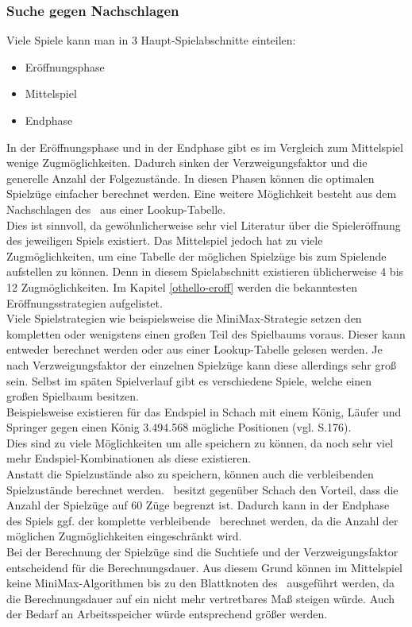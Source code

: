 \subsubsection{Suche gegen Nachschlagen}
\label{lookup}
Viele Spiele kann man in 3 Haupt-Spielabschnitte einteilen:
\begin{itemize}
\item Eröffnungsphase
\item Mittelspiel
\item Endphase
\end{itemize}
In der Eröffnungsphase und in der Endphase gibt es im Vergleich zum Mittelspiel wenige Zugmöglichkeiten. Dadurch sinken der Verzweigungsfaktor und die generelle Anzahl der Folgezustände. In diesen Phasen können die optimalen Spielzüge einfacher berechnet werden. Eine weitere Möglichkeit besteht aus dem Nachschlagen des \states\ aus einer Lookup-Tabelle.
\\Dies ist sinnvoll, da gewöhnlicherweise sehr viel Literatur über die Spieleröffnung des jeweiligen Spiels existiert.
Das Mittelspiel jedoch hat zu viele Zugmöglichkeiten, um eine Tabelle der möglichen Spielzüge bis zum Spielende aufstellen zu können. Denn in diesem Spielabschnitt existieren üblicherweise 4 bis 12 Zugmöglichkeiten. Im Kapitel \ref{othello-eroff} werden die bekanntesten Eröffnungsstrategien aufgelistet.
\\Viele Spielstrategien wie beispielsweise die MiniMax-Strategie setzen den kompletten oder wenigstens einen großen Teil des Spielbaums voraus. Dieser kann entweder berechnet werden oder aus einer Lookup-Tabelle gelesen werden. Je nach Verzweigungsfaktor der einzelnen Spielzüge kann diese allerdings sehr groß sein. Selbst im späten Spielverlauf gibt es verschiedene Spiele, welche einen großen Spielbaum besitzen.
\\Beispielsweise existieren für das Endspiel in Schach mit einem König, Läufer und Springer gegen einen König 3.494.568 mögliche Positionen (vgl. \cite{Russell.2016} S.176).
\\Dies sind zu viele Möglichkeiten um alle speichern zu können, da noch sehr viel mehr Endspiel-Kombinationen als diese existieren.
\\Anstatt die Spielzustände also zu speichern, können auch die verbleibenden Spielzustände berechnet werden. \ot\ besitzt gegenüber Schach den Vorteil, dass die Anzahl der Spielzüge auf 60 Züge begrenzt ist. Dadurch kann in der Endphase des Spiels ggf. der komplette verbleibende \gtree\ berechnet werden, da die Anzahl der möglichen Zugmöglichkeiten eingeschränkt wird.
\\Bei der Berechnung der Spielzüge sind die Suchtiefe und der Verzweigungsfaktor entscheidend für die Berechnungsdauer. Aus diesem Grund können im Mittelspiel keine MiniMax-Algorithmen bis zu den Blattknoten des \gtrees\ ausgeführt werden, da die Berechnungsdauer auf ein nicht mehr vertretbares Maß steigen würde. Auch der Bedarf an Arbeitsspeicher würde entsprechend größer werden.

